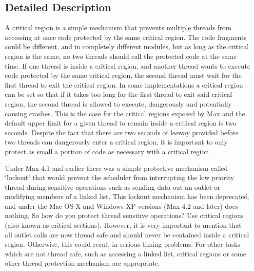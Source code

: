 \subsection{Detailed Description}
A critical region is a simple mechanism that prevents multiple threads from accessing at once code protected by the same critical region. The code fragments could be different, and in completely different modules, but as long as the critical region is the same, no two threads should call the protected code at the same time. If one thread is inside a critical region, and another thread wants to execute code protected by the same critical region, the second thread must wait for the first thread to exit the critical region. In some implementations a critical region can be set so that if it takes too long for the first thread to exit said critical region, the second thread is allowed to execute, dangerously and potentially causing crashes. This is the case for the critical regions exposed by Max and the default upper limit for a given thread to remain inside a critical region is two seconds. Despite the fact that there are two seconds of leeway provided before two threads can dangerously enter a critical region, it is important to only protect as small a portion of code as necessary with a critical region.

Under Max 4.1 and earlier there was a simple protective mechanism called \char`\"{}lockout\char`\"{} that would prevent the scheduler from interrupting the low priority thread during sensitive operations such as sending data out an outlet or modifying members of a linked list. This lockout mechanism has been deprecated, and under the Mac OS X and Windows XP versions (Max 4.2 and later) does nothing. So how do you protect thread sensitive operations? Use critical regions (also known as critical sections). However, it is very important to mention that all outlet calls are now thread safe and should never be contained inside a critical region. Otherwise, this could result in serious timing problems. For other tasks which are not thread safe, such as accessing a linked list, critical regions or some other thread protection mechanism are appropriate.

